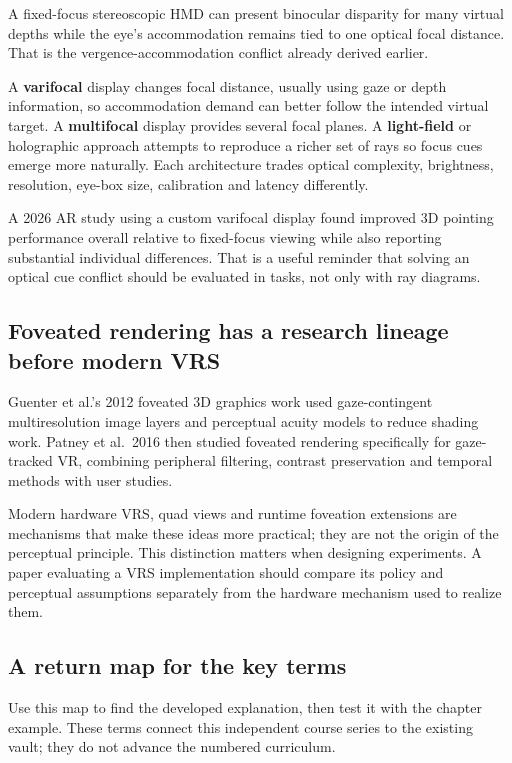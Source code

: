 A fixed-focus stereoscopic HMD can present binocular disparity for many virtual depths while the eye's accommodation remains tied to one optical focal distance. That is the vergence-accommodation conflict already derived earlier.

A \textbf{varifocal} display changes focal distance, usually using gaze or depth information, so accommodation demand can better follow the intended virtual target. A \textbf{multifocal} display provides several focal planes. A \textbf{light-field} or holographic approach attempts to reproduce a richer set of rays so focus cues emerge more naturally. Each architecture trades optical complexity, brightness, resolution, eye-box size, calibration and latency differently.

A 2026 AR study using a custom varifocal display found improved 3D pointing performance overall relative to fixed-focus viewing while also reporting substantial individual differences. That is a useful reminder that solving an optical cue conflict should be evaluated in tasks, not only with ray diagrams.

\subsection{Foveated rendering has a research lineage before modern VRS}\label{foveated-rendering-has-a-research-lineage-before-modern-vrs}

Guenter et al.'s 2012 foveated 3D graphics work used gaze-contingent multiresolution image layers and perceptual acuity models to reduce shading work. Patney et al.~2016 then studied foveated rendering specifically for gaze-tracked VR, combining peripheral filtering, contrast preservation and temporal methods with user studies.

Modern hardware VRS, quad views and runtime foveation extensions are mechanisms that make these ideas more practical; they are not the origin of the perceptual principle. This distinction matters when designing experiments. A paper evaluating a VRS implementation should compare its policy and perceptual assumptions separately from the hardware mechanism used to realize them.

\subsection{A return map for the key terms}\label{a-return-map-for-the-key-terms}

Use this map to find the developed explanation, then test it with the chapter example. These terms connect this independent course series to the existing vault; they do not advance the numbered curriculum.

